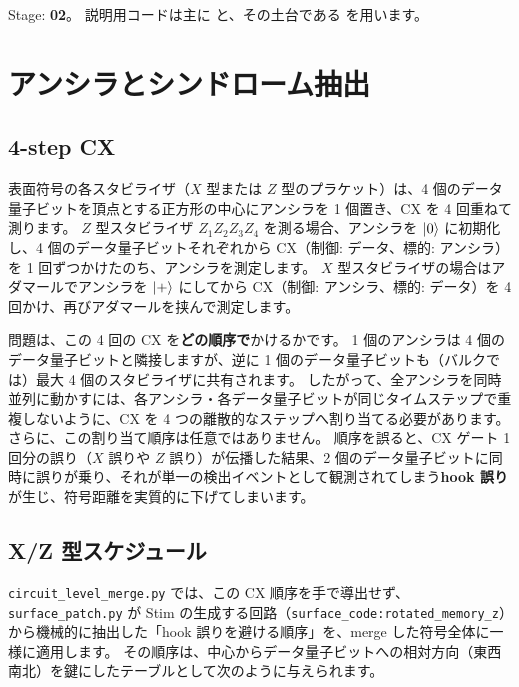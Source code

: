 \begin{notebox}
  Stage: \textbf{02}。
  説明用コードは主に  と、その土台である  を用います。
\end{notebox}

\section{アンシラとシンドローム抽出}\label{sec:ancilla}

\subsection{4-step CX}

表面符号の各スタビライザ（$X$ 型または $Z$ 型のプラケット）は、4 個のデータ量子ビットを頂点とする正方形の中心にアンシラを 1 個置き、CX を 4 回重ねて測ります。
$Z$ 型スタビライザ $Z_1Z_2Z_3Z_4$ を測る場合、アンシラを $\ket{0}$ に初期化し、4 個のデータ量子ビットそれぞれから CX（制御: データ、標的: アンシラ）を 1 回ずつかけたのち、アンシラを測定します。
$X$ 型スタビライザの場合はアダマールでアンシラを $\ket{+}$ にしてから CX（制御: アンシラ、標的: データ）を 4 回かけ、再びアダマールを挟んで測定します。

問題は、この 4 回の CX を\textbf{どの順序で}かけるかです。
1 個のアンシラは 4 個のデータ量子ビットと隣接しますが、逆に 1 個のデータ量子ビットも（バルクでは）最大 4 個のスタビライザに共有されます。
したがって、全アンシラを同時並列に動かすには、各アンシラ・各データ量子ビットが同じタイムステップで重複しないように、CX を 4 つの離散的なステップへ割り当てる必要があります。
さらに、この割り当て順序は任意ではありません。
順序を誤ると、CX ゲート 1 回分の誤り（$X$ 誤りや $Z$ 誤り）が伝播した結果、2 個のデータ量子ビットに同時に誤りが乗り、それが単一の検出イベントとして観測されてしまう\textbf{hook 誤り}が生じ、符号距離を実質的に下げてしまいます。

\subsection{X/Z 型スケジュール}

\texttt{circuit\_level\_merge.py} では、この CX 順序を手で導出せず、\texttt{surface\_patch.py} が Stim の生成する回路（\texttt{surface\_code:rotated\_memory\_z}）から機械的に抽出した「hook 誤りを避ける順序」を、merge した符号全体に一様に適用します。
その順序は、中心からデータ量子ビットへの相対方向（東西南北）を鍵にしたテーブルとして次のように与えられます。


